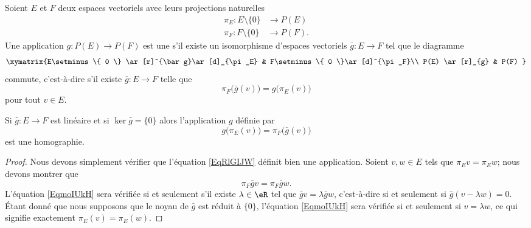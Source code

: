 \begin{definition}      \label{DEFooKWSMooXvOeEP}
    Soient \( E\) et \( F\) deux espaces vectoriels avec leurs projections naturelles
    \begin{subequations}
        \begin{align}
            \pi_E\colon E\setminus\{ 0 \}&\to P(E)\\
            \pi_F\colon F\setminus\{ 0 \}&\to P(F).
        \end{align}
    \end{subequations}
    Une application \( g\colon P(E)\to P(F)\) est une  s'il existe un isomorphisme d'espaces vectoriels \( \bar g\colon E\to F\) tel que le diagramme
    \begin{equation}
        \xymatrix{%
        E\setminus\{ 0 \} \ar[r]^{\bar g}\ar[d]_{\pi_E}        &   F\setminus\{ 0 \}\ar[d]^{\pi_F}\\
           P(E) \ar[r]_{g}   &   P(F)
           }
    \end{equation}
    commute, c'est-à-dire s'il existe \( \bar g\colon E\to F\) telle que
    \begin{equation}        \label{EQooSEFWooRpjLxt}
        \pi_F\big( \bar g(v) \big)=g\big( \pi_E(v) \big)
    \end{equation}
    pour tout \( v\in E\).
\end{definition}

\begin{lemma}
    Si \( \bar g\colon E\to F\) est linéaire et si \( \ker\bar g=\{ 0 \}\) alors l'application \( g\) définie par
    \begin{equation}        \label{EqRlGIJW}
        g\big( \pi_E(v) \big)=\pi_F\big( \bar g(v) \big)
    \end{equation}
    est une homographie.
\end{lemma}

\begin{proof}
    Nous devons simplement vérifier que l'équation \eqref{EqRlGIJW} définit bien une application. Soient \( v,w\in E\) tels que \( \pi_Ev=\pi_Ew\); nous devons montrer que
    \begin{equation}        \label{EqmoIUkH}
        \pi_F\bar gv=\pi_F\bar gw.
    \end{equation}
    L'équation \eqref{EqmoIUkH} sera vérifiée si et seulement s'il existe \( \lambda\in\eR\) tel que \( \bar gv=\lambda\bar gw\), c'est-à-dire si et seulement si \( \bar g(v-\lambda w)=0\). Étant donné que nous supposons que le noyau de \( \bar g\) est réduit à \( \{ 0 \}\), l'équation \eqref{EqmoIUkH} sera vérifiée si et seulement si \( v=\lambda w\), ce qui signifie exactement \( \pi_E(v)=\pi_E(w)\).
\end{proof}

